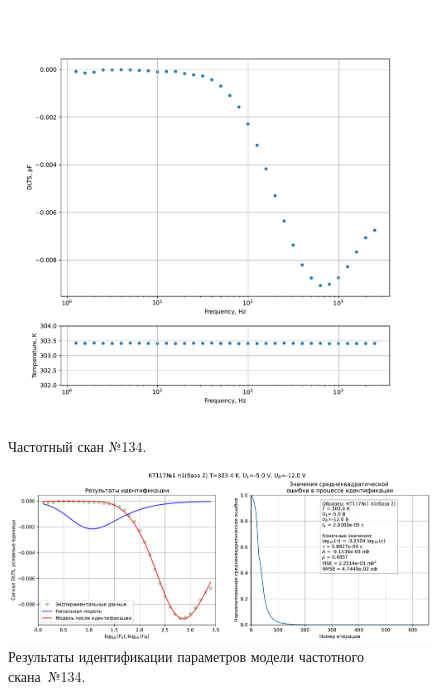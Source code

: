 \begin{figure}[!ht]
    \centering
    \includegraphics[width=1\textwidth]{../plots/КТ117№1_п1(база 2)_2500Гц-1Гц_1пФ_+30С_-5В-12В_200мВ_20мкс_шаг_0,1.pdf}
    \caption{Частотный скан №134.}
    \label{pic:frequency_scan_134}
\end{figure}

\begin{figure}[!ht]
    \centering
    \includegraphics[width=1\textwidth]{../plots/КТ117№1_п1(база 2)_2500Гц-1Гц_1пФ_+30С_-5В-12В_200мВ_20мкс_шаг_0,1_model.pdf}
    \caption{Результаты идентификации параметров модели частотного скана~№134.}
    \label{pic:frequency_scan_model134}
\end{figure}

\pagebreak


